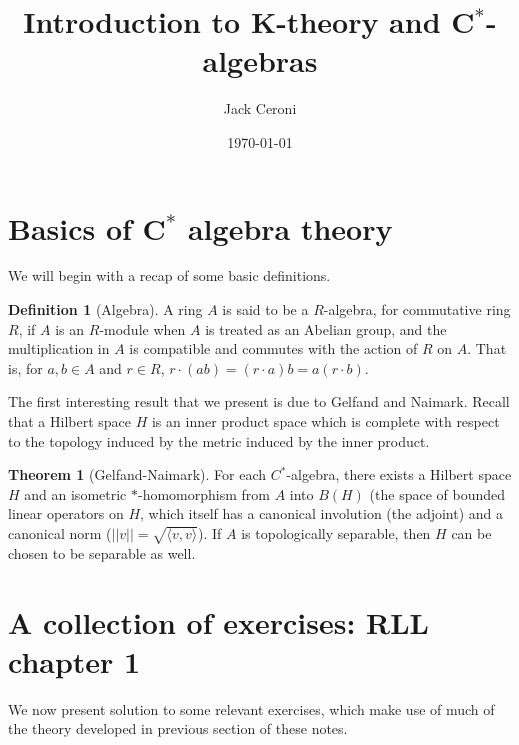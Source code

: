 \documentclass[aps,pra,showpacs,notitlepage,onecolumn,superscriptaddress,nofootinbib]{revtex4-1}
\theoremstyle{definition}
\newtheorem{definition}{Definition}[section]
\newtheorem{theorem}{Theorem}[section]
\begin{document}
\title{Introduction to K-theory and C$^{*}$-algebras}
\author{Jack Ceroni}

\date{\today}

\maketitle

\section{Basics of C$^{*}$ algebra theory}

\noindent We will begin with a recap of some basic definitions.

\begin{definition}[Algebra]
  A ring $A$ is said to be a $R$-algebra, for commutative ring $R$, if $A$ is an $R$-module when $A$ is treated as an Abelian group, and the multiplication in $A$
  is compatible and commutes with the action of $R$ on $A$. That is, for $a, b \in A$ and $r \in R$, $r \cdot (ab) = (r \cdot a)b = a(r \cdot b)$.
\end{definition}

The first interesting result that we present is
due to Gelfand and Naimark. Recall that a Hilbert space $H$ is an inner product space which is complete with respect to the topology induced by the metric induced by the inner product.

\begin{theorem}[Gelfand-Naimark]
  For each $C^{*}$-algebra, there exists a Hilbert space $H$ and an isometric $*$-homomorphism from $A$ into $B(H)$ (the space of bounded linear operators on $H$, which itself
  has a canonical involution (the adjoint) and a canonical norm ($||v|| = \sqrt{\langle v, v \rangle}$). If $A$ is topologically separable, then $H$ can be chosen to be separable as well. 
\end{theorem}

\section{A collection of exercises: RLL chapter 1}

\noindent We now present solution to some relevant exercises, which make use of much of the theory developed in previous section of these notes.
\end{document}
